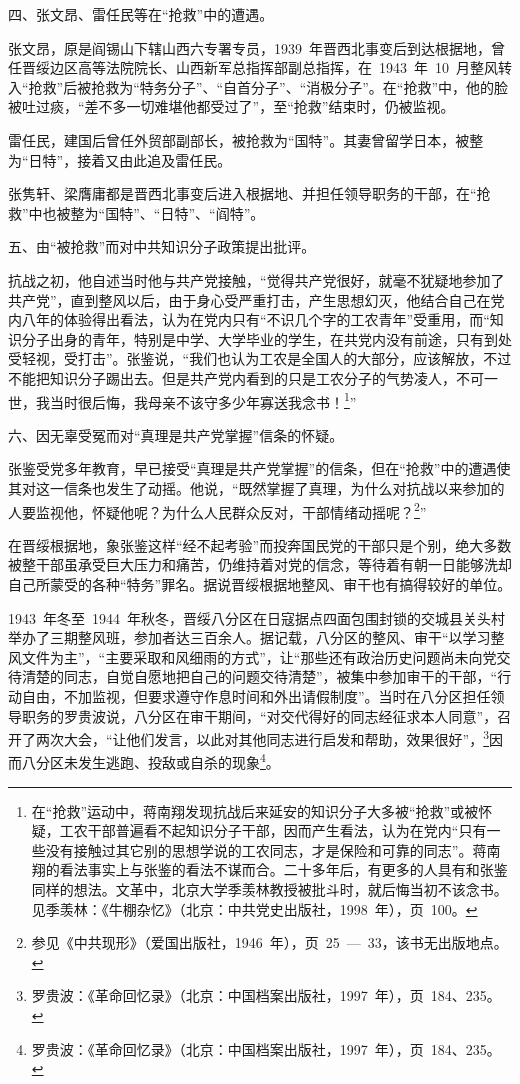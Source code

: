 四、张文昂、雷任民等在“抢救”中的遭遇。

张文昂，原是阎锡山下辖山西六专署专员，1939~年晋西北事变后到达根据地，曾任晋绥边区高等法院院长、山西新军总指挥部副总指挥，在~1943~年~10~月整风转入“抢救”后被抢救为“特务分子”、“自首分子”、“消极分子”。在“抢救”中，他的脸被吐过痰，“差不多一切难堪他都受过了”，至“抢救”结束时，仍被监视。

雷任民，建国后曾任外贸部副部长，被抢救为“国特”。其妻曾留学日本，被整为“日特”，接着又由此追及雷任民。

张隽轩、梁膺庸都是晋西北事变后进入根据地、并担任领导职务的干部，在“抢救”中也被整为“国特”、“日特”、“阎特”。

五、由“被抢救”而对中共知识分子政策提出批评。

抗战之初，他自述当时他与共产党接触，“觉得共产党很好，就毫不犹疑地参加了共产党”，直到整风以后，由于身心受严重打击，产生思想幻灭，他结合自己在党内八年的体验得出看法，认为在党内只有“不识几个字的工农青年”受重用，而“知识分子出身的青年，特别是中学、大学毕业的学生，在共党内没有前途，只有到处受轻视，受打击”。张鉴说，“我们也认为工农是全国人的大部分，应该解放，不过不能把知识分子踢出去。但是共产党内看到的只是工农分子的气势凌人，不可一世，我当时很后悔，我母亲不该守多少年寡送我念书！\footnote{在“抢救”运动中，蒋南翔发现抗战后来延安的知识分子大多被“抢救”或被怀疑，工农干部普遍看不起知识分子干部，因而产生看法，认为在党内“只有一些没有接触过其它别的思想学说的工农同志，才是保险和可靠的同志”。蒋南翔的看法事实上与张鉴的看法不谋而合。二十多年后，有更多的人具有和张鉴同样的想法。文革中，北京大学季羡林教授被批斗时，就后悔当初不该念书。见季羡林：《牛棚杂忆》（北京：中共党史出版社，1998~年），页~100。}”

六、因无辜受冤而对“真理是共产党掌握”信条的怀疑。

张鉴受党多年教育，早已接受“真理是共产党掌握”的信条，但在“抢救”中的遭遇使其对这一信条也发生了动摇。他说，“既然掌握了真理，为什么对抗战以来参加的人要监视他，怀疑他呢？为什么人民群众反对，干部情绪动摇呢？\footnote{参见《中共现形》（爱国出版社，1946~年），页~25~—~33，该书无出版地点。}”

在晋绥根据地，象张鉴这样“经不起考验”而投奔国民党的干部只是个别，绝大多数被整干部虽承受巨大压力和痛苦，仍维持着对党的信念，等待着有朝一日能够洗却自己所蒙受的各种“特务”罪名。据说晋绥根据地整风、审干也有搞得较好的单位。

1943~年冬至~1944~年秋冬，晋绥八分区在日寇据点四面包围封锁的交城县关头村举办了三期整风班，参加者达三百余人。据记载，八分区的整风、审干“以学习整风文件为主”，“主要采取和风细雨的方式”，让“那些还有政治历史问题尚未向党交待清楚的同志，自觉自愿地把自己的问题交待清楚”，被集中参加审干的干部，“行动自由，不加监视，但要求遵守作息时间和外出请假制度”。当时在八分区担任领导职务的罗贵波说，八分区在审干期间，“对交代得好的同志经征求本人同意”，召开了两次大会，“让他们发言，以此对其他同志进行启发和帮助，效果很好”，\footnote{罗贵波：《革命回忆录》（北京：中国档案出版社，1997~年），页~184、235。}因而八分区未发生逃跑、投敌或自杀的现象\footnote{罗贵波：《革命回忆录》（北京：中国档案出版社，1997~年），页~184、235。}。

